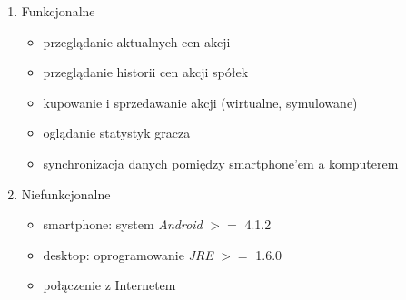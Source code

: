 \begin{enumerate}
    \item Funkcjonalne
    \begin{itemize}
        \item przeglądanie aktualnych cen akcji
        \item przeglądanie historii cen akcji spółek
        \item kupowanie i sprzedawanie akcji (wirtualne, symulowane)
        \item oglądanie statystyk gracza
        \item synchronizacja danych pomiędzy smartphone'em a komputerem
    \end{itemize}
    
    \item Niefunkcjonalne
    \begin{itemize}
        \item smartphone: system \emph{Android} $>=$ 4.1.2
        \item desktop: oprogramowanie \emph{JRE} $>=$ 1.6.0
        \item połączenie z Internetem
    \end{itemize} 
\end{enumerate} 

